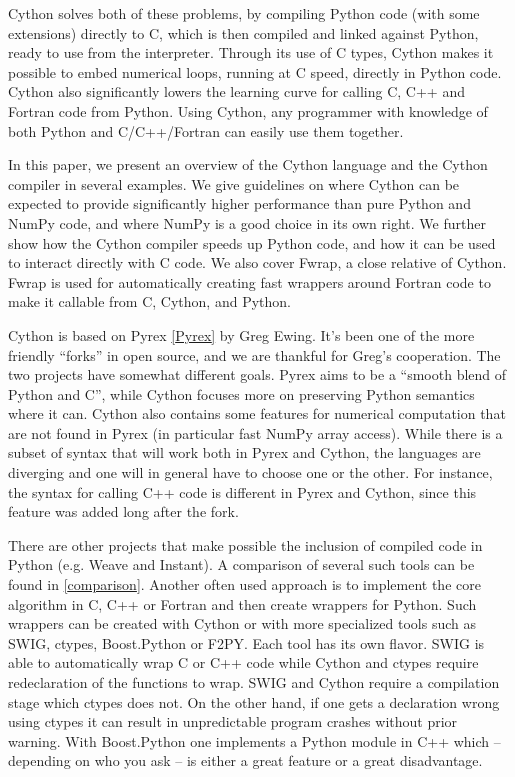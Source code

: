 \documentclass[letterpaper,11pt,english]{article}
\begin{document}
Cython solves both of these problems, by compiling Python code (with
some extensions) directly to C, which is then compiled and linked
against Python, ready to use from the interpreter.
Through its use of C types, Cython makes it possible to
embed numerical loops, running at C speed, directly in Python code.
Cython also significantly lowers the learning curve for calling C, C++
and Fortran code from Python. Using Cython, any programmer with
knowledge of both Python and C/C++/Fortran can easily use them
together.

In this paper, we present an overview of the Cython language and the
Cython compiler in several examples.  We give guidelines on where
Cython can be expected to provide significantly higher performance
than pure Python and NumPy code, and where NumPy is a good choice in
its own right.  We further show how the Cython compiler speeds up
Python code, and how it can be used to interact directly with C code.
We also cover Fwrap, a close relative of Cython. Fwrap is used for
automatically creating fast wrappers around Fortran code to make it
callable from C, Cython, and Python.

Cython is based on Pyrex \hyperlink{pyrex}{{[}Pyrex{]}} by Greg Ewing. It's been one of the
more friendly ``forks'' in open source, and we are thankful for Greg's
cooperation. The two projects have somewhat different goals. Pyrex
aims to be a ``smooth blend of Python and C'', while Cython focuses more
on preserving Python semantics where it can. Cython also contains some
features for numerical computation that are not found in Pyrex (in
particular fast NumPy array access). While there is a subset of syntax
that will work both in Pyrex and Cython, the languages are diverging
and one will in general have to choose one or the other. For instance,
the syntax for calling C++ code is different in Pyrex and Cython,
since this feature was added long after the fork.

There are other projects that make possible the inclusion of compiled
code in Python (e.g. Weave and Instant). A comparison of several such tools
can be found in \hyperlink{comparison}{{[}comparison{]}}. Another often used approach is to
implement the core algorithm in C, C++ or Fortran and then
create wrappers for Python. Such wrappers can be created with Cython
or with more specialized tools such as SWIG, ctypes, Boost.Python or
F2PY.  Each tool has its own flavor. SWIG is able to automatically
wrap C or C++ code while Cython and ctypes require redeclaration of
the functions to wrap. SWIG and Cython require a compilation stage
which ctypes does not. On the other hand, if one gets a declaration
wrong using ctypes it can result in unpredictable program crashes
without prior warning. With Boost.Python one implements a Python
module in C++ which -- depending on who you ask -- is either a great
feature or a great disadvantage.
\end{document}

